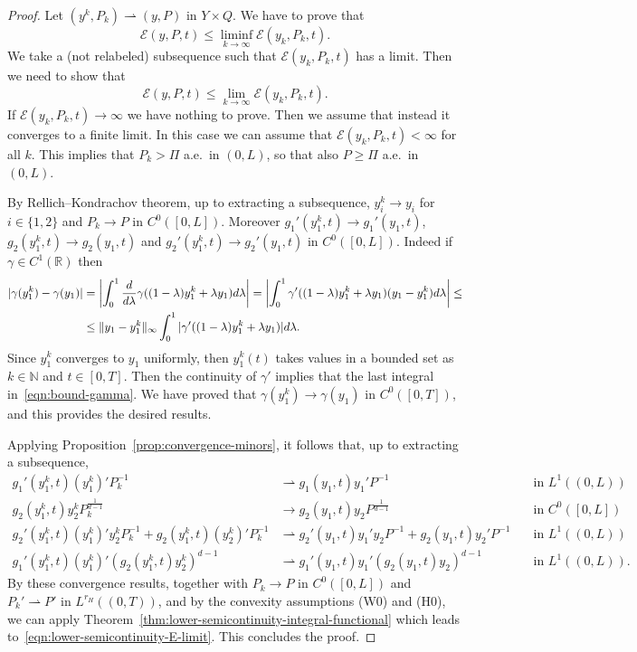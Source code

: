 \documentclass[a4paper,10pt,twoside]{amsbook}
\numberwithin{section}{chapter}
\numberwithin{equation}{chapter}
\theoremstyle{definition}
\DeclarePairedDelimiter{\norm}{\lVert}{\rVert}
\begin{document}
\begin{proof}
Let $(y^k,P_k)\rightharpoonup(y,P)$ in $Y\times Q$. We have to prove that
\[
\mathcal{E}(y,P,t)\le\liminf_{k\to\infty}\mathcal{E}(y_k,P_k,t).
\]
We take a (not relabeled) subsequence such that $\mathcal{E}(y_k,P_k,t)$ has a limit. Then we need to show that
\begin{equation}
\label{eqn:lower-semicontinuity-E-limit}
\mathcal{E}(y,P,t)\le\lim_{k\to\infty}\mathcal{E}(y_k,P_k,t).
\end{equation}
If $\mathcal{E}(y_k,P_k,t)\to\infty$ we have nothing to prove. Then we assume that instead it converges to a finite limit. In this case we can assume that $\mathcal{E}(y_k,P_k,t)<\infty$ for all $k$. This implies that $P_k>\Pi$ a.e.\ in $(0,L)$, so that also $P\ge \Pi$ a.e.\ in $(0,L)$.

By Rellich--Kondrachov theorem, up to extracting a subsequence, $y_i^k\to y_i$ for $i\in\{1,2\}$ and $P_k\to P$ in $C^0([0,L])$.  Moreover $g_1'(y_1^k,t)\to g_1'(y_1,t)$, $g_2(y_1^k,t)\to g_2(y_1,t)$ and $g_2'(y_1^k,t)\to g_2'(y_1,t)$ in $C^0([0,L])$. Indeed if $\gamma\in C^1(\mathbb{R})$ then
\begin{equation}
\label{eqn:bound-gamma}
\begin{split}
|\gamma(y_1^k)-\gamma(y_1)|&=\left|\int_0^1\frac{d}{d\lambda}\gamma((1-\lambda)y_1^k+\lambda y_1)d\lambda\right|=\left|\int_0^1\gamma'((1-\lambda)y_1^k+\lambda y_1)(y_1-y_1^k)d\lambda\right|\le\\
&\le\norm{y_1-y_1^k}_\infty\int_0^1|\gamma'((1-\lambda)y_1^k+\lambda y_1)|d\lambda.
\end{split}
\end{equation}
Since $y_1^k$ converges to $y_1$ uniformly, then $y_1^k(t)$ takes values in a bounded set as $k\in\mathbb{N}$ and $t\in[0,T]$. Then the continuity of $\gamma'$ implies that the last integral in~\eqref{eqn:bound-gamma}. We have proved that $\gamma(y_1^k)\to\gamma(y_1)$ in $C^0([0,T])$, and this provides the desired results.

Applying Proposition~\ref{prop:convergence-minors}, it follows that, up to extracting a subsequence,
\begin{align*}
g_1'(y_1^k,t)(y_1^k)'P_k^{-1}&\rightharpoonup g_1(y_1,t)y_1'P^{-1}\quad&\text{in $L^1((0,L))$} \\
g_2(y_1^k,t)y_2^kP_k^\frac{1}{d-1}&\to g_2(y_1,t)y_2P^\frac{1}{d-1}\quad&\text{in $C^0([0,L])$} \\
g_2'(y_1^k,t)(y_1^k)'y_2^kP_k^{-1}+g_2(y_1^k,t)(y_2^k)'P_k^{-1}&\rightharpoonup g_2'(y_1,t)y_1'y_2P^{-1}+g_2(y_1,t)y_2'P^{-1}\quad&\text{in $L^1((0,L))$} \\
g_1'(y_1^k,t)(y_1^k)'(g_2(y_1^k,t)y_2^k)^{d-1}&\rightharpoonup g_1'(y_1,t)y_1'(g_2(y_1,t)y_2)^{d-1}\quad&\text{in $L^1((0,L))$}.
\end{align*}
By these convergence results, together with $P_k\to P$ in $C^0([0,L])$ and $P_k'\rightharpoonup P'$ in $L^{r_H}((0,T))$, and by the convexity assumptions (W0) and (H0), we can apply Theorem~\ref{thm:lower-semicontinuity-integral-functional} which leads to~\eqref{eqn:lower-semicontinuity-E-limit}. This concludes the proof.
\end{proof}
\end{document}

